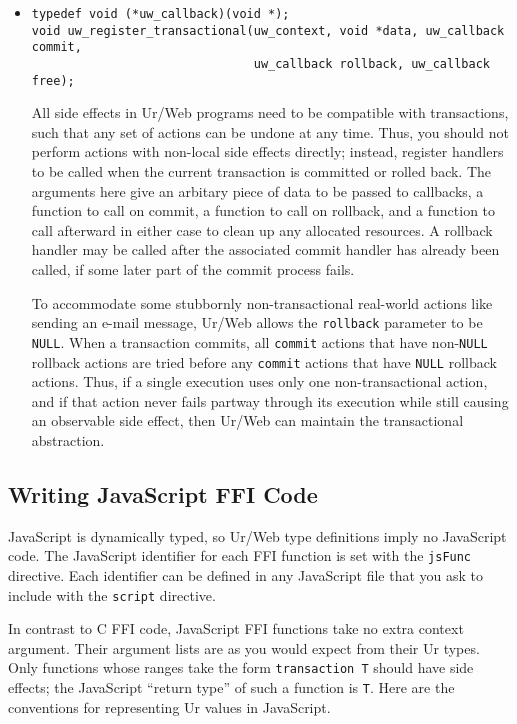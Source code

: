 \documentclass{article}
\begin{document}
\begin{itemize}
  \item \begin{verbatim}
typedef void (*uw_callback)(void *);
void uw_register_transactional(uw_context, void *data, uw_callback commit,
                               uw_callback rollback, uw_callback free);
  \end{verbatim}
  All side effects in Ur/Web programs need to be compatible with transactions, such that any set of actions can be undone at any time.  Thus, you should not perform actions with non-local side effects directly; instead, register handlers to be called when the current transaction is committed or rolled back.  The arguments here give an arbitary piece of data to be passed to callbacks, a function to call on commit, a function to call on rollback, and a function to call afterward in either case to clean up any allocated resources.  A rollback handler may be called after the associated commit handler has already been called, if some later part of the commit process fails.

  To accommodate some stubbornly non-transactional real-world actions like sending an e-mail message, Ur/Web allows the \texttt{rollback} parameter to be \texttt{NULL}.  When a transaction commits, all \texttt{commit} actions that have non-\texttt{NULL} rollback actions are tried before any \texttt{commit} actions that have \texttt{NULL} rollback actions.  Thus, if a single execution uses only one non-transactional action, and if that action never fails partway through its execution while still causing an observable side effect, then Ur/Web can maintain the transactional abstraction.
\end{itemize}


\subsection{Writing JavaScript FFI Code}

JavaScript is dynamically typed, so Ur/Web type definitions imply no JavaScript code.  The JavaScript identifier for each FFI function is set with the \texttt{jsFunc} directive.  Each identifier can be defined in any JavaScript file that you ask to include with the \texttt{script} directive.

In contrast to C FFI code, JavaScript FFI functions take no extra context argument.  Their argument lists are as you would expect from their Ur types.  Only functions whose ranges take the form \texttt{transaction T} should have side effects; the JavaScript ``return type'' of such a function is \texttt{T}.  Here are the conventions for representing Ur values in JavaScript.
\end{document}
